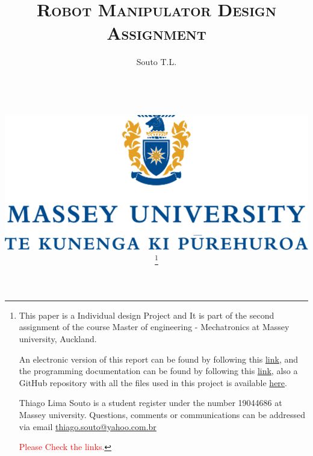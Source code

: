 \documentclass[transmag]{IEEEtran}
\begin{document}
\title{\textsc{Robot Manipulator Design Assignment}}

\clearpage\thispagestyle{empty}

\author{Souto T.L.

\\
\\
\\

\begin{centering}
\vspace{20mm}
\includegraphics[scale=0.25]{massey-png}
\end{centering}



\thanks{This paper is a Individual design Project and It is part of the second assignment of the course Master of engineering - Mechatronics at Massey university, Auckland.

An electronic version of this report can be found by following this \textcolor{blue}{\href{https://thiagosoutogit.github.io/Masters/Pages/Automation/Assessment02RoboticArm.html}{link}}, and the programming documentation can be found by following this \textcolor{blue}{\href{https://thiagosoutogit.github.io/Robot-Manipulator/}{link}}, also a GitHub repository with all the files used in this project is available \textcolor{blue}{\href{https://github.com/ThiagoSoutoGit/Robot-Manipulator}{here}}. 

Thiago Lima Souto is a student register under the number 19044686 at Massey university. Questions, comments or communications can be addressed via email \color{blue}\href{mailto:thiago.souto@yahoo.com.br}{thiago.souto@yahoo.com.br}

\textcolor{red}{Please Check the links.}
}}
\end{document}
